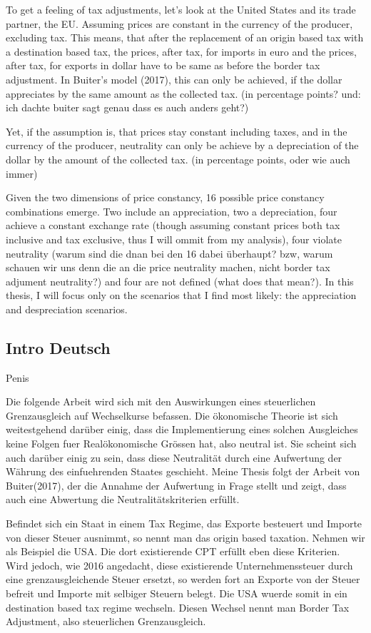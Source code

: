 To get a feeling of tax adjustments, let’s look at the United States and its trade partner, the EU. Assuming prices are constant in the currency of the producer, excluding tax. This means, that after the replacement of an origin based tax with a destination based tax, the prices, after tax, for imports in euro and the prices, after tax, for exports in dollar have to be same as before the border tax adjustment. In Buiter’s model (2017), this can only be achieved, if the dollar appreciates by the same amount as the collected tax. (in percentage points? und: ich dachte buiter sagt genau dass es auch anders geht?)

Yet, if the assumption is, that prices stay constant including taxes, and in the currency of the producer, neutrality can only be achieve by a depreciation of the dollar by the amount of the collected tax. (in percentage points, oder wie auch immer)

Given the two dimensions of price constancy, 16 possible price constancy combinations emerge. Two include an appreciation, two a depreciation, four achieve a constant exchange rate (though assuming constant prices both tax inclusive and tax exclusive, thus I will ommit from my analysis), four violate neutrality (warum sind die dnan bei den 16 dabei überhaupt? bzw, warum schauen wir uns denn die an die price neutrality machen, nicht border tax adjument neutrality?) and four are not defined (what does that mean?). In this thesis, I will focus only on the scenarios that I find most likely: the appreciation and despreciation scenarios. 

\subsection{Intro Deutsch}
Penis


Die folgende Arbeit wird sich mit den Auswirkungen eines steuerlichen Grenzausgleich auf Wechselkurse befassen. Die ökonomische Theorie ist sich weitestgehend darüber einig, dass die Implementierung eines solchen Ausgleiches keine Folgen fuer Realökonomische Grössen hat, also neutral ist. Sie scheint sich auch darüber einig zu sein, dass diese Neutralität durch eine Aufwertung der Währung des einfuehrenden Staates geschieht. 
Meine Thesis folgt der Arbeit von Buiter(2017), der die Annahme der Aufwertung in Frage stellt und zeigt, dass auch eine Abwertung die Neutralitätskriterien erfüllt. 

Befindet sich ein Staat in einem Tax Regime, das Exporte besteuert und Importe von dieser Steuer ausnimmt, so nennt man das origin based taxation. Nehmen wir als Beispiel die USA. Die dort existierende CPT erfüllt eben diese Kriterien. Wird jedoch, wie 2016 angedacht, diese existierende Unternehmenssteuer durch eine grenzausgleichende Steuer ersetzt, so werden fort an Exporte von der Steuer befreit und Importe mit selbiger Steuern belegt. Die USA wuerde somit in ein destination based tax regime wechseln. 
Diesen Wechsel nennt man Border Tax Adjustment, also steuerlichen Grenzausgleich. 

